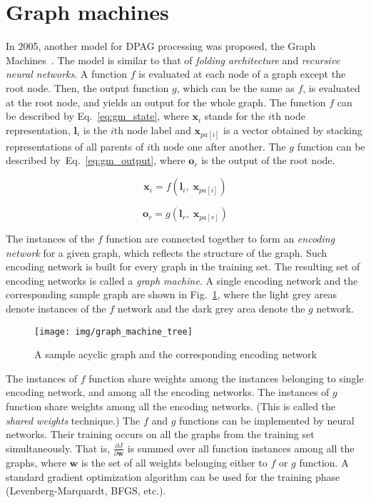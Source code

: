 \section{Graph machines}
In 2005, another model for DPAG processing was proposed, the Graph Machines~\cite{goulon2005learning}. The model is similar to that of \emph{folding architecture} and \emph{recursive neural networks}. A function $f$ is evaluated at each node of a graph except the root node. Then, the output function $g$, which can be the same as $f$, is evaluated at the root node, and yields an output for the whole graph. The function $f$ can be described by Eq.~\ref{eq:gm_state}, where $\bm{x}_i$ stands for the $i$th node representation, $\bm{l}_i$ is the $i$th node label and $\bm{x}_{pa[i]}$ is a vector obtained by stacking representations of all parents of $i$th node one after another. The $g$ function can be described by~Eq.~\ref{eq:gm_output}, where $\bm{o}_r$ is the output of the root node.

\begin{equation}
\bm{x}_i = f(\bm{l}_i, \; \bm{x}_{pa[i]})
\label{eq:gm_state}
\end{equation}

\begin{equation}
\bm{o}_r = g(\bm{l}_r, \; \bm{x}_{pa[r]})
\label{eq:gm_output}
\end{equation}

The instances of the $f$ function are connected together to form an \emph{encoding network} for a given graph, which reflects the structure of the graph. Such encoding network is built for every graph in the training set. The resulting set of encoding networks is called a \emph{graph machine}. A single encoding network and the corresponding sample graph are shown in Fig.~\ref{fig:graph_machine_tree}, where the light grey areas denote instances of the $f$ network and the dark grey area denote the $g$ network.

\begin{figure}
\begin{center}
	\texttt{[image: img/graph\_machine\_tree]}
	\caption{A sample acyclic graph and the corresponding encoding network}
	\label{fig:graph_machine_tree}
\end{center}
\end{figure}

The instances of $f$ function share weights among the instances belonging to single encoding network, and among all the encoding networks. The instances of $g$ function share weights among all the encoding networks. (This is called the \emph{shared weights} technique.) The $f$ and $g$ functions can be implemented by neural networks. Their training occurs on all the graphs from the training set simultaneously. That is, $\frac{\partial J}{\partial \bm{w}}$ is summed over all function instances among all the graphs, where $\bm{w}$ is the set of all weights belonging either to $f$ or $g$ function. A standard gradient optimization algorithm can be used for the training phase (Levenberg-Marquardt, BFGS, etc.).

